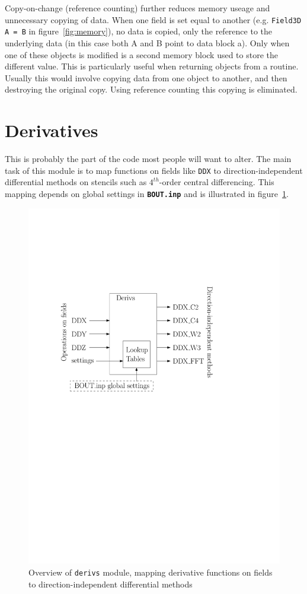 \documentclass[12pt]{article}
\newcommand{\code}[1]{\texttt{#1}}
\newcommand{\file}[1]{\texttt{\bf #1}}
\begin{document}
Copy-on-change (reference counting) further reduces memory useage and unnecessary copying of data. 
When one field is set equal to another (e.g. \code{Field3D A = B} in figure~\ref{fig:memory}), no 
data is copied, only the reference to the underlying data (in this case both A and B point to data block a). 
Only when one of these objects is modified is a second memory block used to store the different value. 
This is particularly useful when returning objects from a routine. Usually this would
involve copying data from one object to another, and then destroying the original copy. Using
reference counting this copying is eliminated.

\section{Derivatives}

This is probably the part of the code most people will want to alter. The main
task of this module is to map functions on fields like \code{DDX} to direction-independent
differential methods on stencils such as $4^{th}$-order central differencing. This mapping depends on global settings in \file{BOUT.inp}
and is illustrated in figure~\ref{fig:diffOverview}.
\begin{figure}[htb!]
\centering
\includegraphics[scale=0.75]{figs/diffOverview.pdf}
\caption{Overview of \code{derivs} module, mapping derivative functions on fields to direction-independent differential methods}
\label{fig:diffOverview}
\end{figure}
\end{document}
